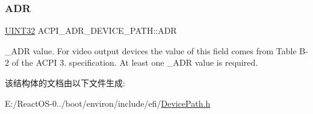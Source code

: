 \subsubsection{\texorpdfstring{A\+DR}{ADR}}
{\footnotesize\ttfamily \hyperlink{_processor_bind_8h_ae1e6edbbc26d6fbc71a90190d0266018}{U\+I\+N\+T32} A\+C\+P\+I\+\_\+\+A\+D\+R\+\_\+\+D\+E\+V\+I\+C\+E\+\_\+\+P\+A\+T\+H\+::\+A\+DR}

\+\_\+\+A\+DR value. For video output devices the value of this field comes from Table B-\/2 of the A\+C\+PI 3. specification. At least one \+\_\+\+A\+DR value is required. 

该结构体的文档由以下文件生成\+:\begin{DoxyCompactItemize}
\item 
E\+:/\+React\+O\+S-\/0../boot/environ/include/efi/\hyperlink{_device_path_8h}{Device\+Path.\+h}\end{DoxyCompactItemize}

